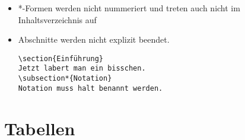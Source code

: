 \begin{frame}[fragile]
\begin{itemize}
\begin{itemize}
        \item \lstinline!\subparagraph!, \lstinline!\subparagraph*!
      \end{itemize}
    \item<+-> *-Formen werden nicht nummeriert und treten auch nicht im
      Inhaltsverzeichnis auf
    \item<+-> Abschnitte werden nicht explizit beendet.
\begin{lstlisting}
\section{Einführung}
Jetzt labert man ein bisschen.
\subsection*{Notation}
Notation muss halt benannt werden.
\end{lstlisting}
  \end{itemize}

\end{frame}

\section{Tabellen}

